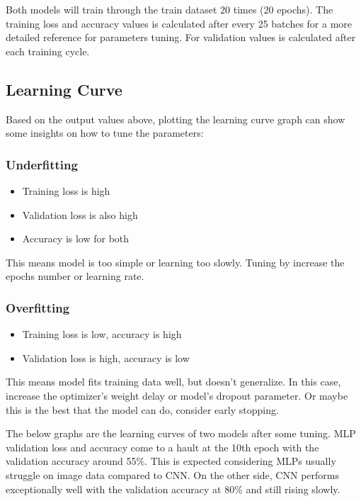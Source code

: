 \documentclass{report}
\begin{document}
Both models will train through the train dataset 20 times (20 epochs). The training loss and accuracy values is calculated 
after every 25 batches for a more detailed reference for parameters tuning. For validation values is calculated
after each training cycle.

\subsection{Learning Curve}
Based on the output values above, plotting the learning curve graph can show some insights on how to tune the 
parameters:

\subsubsection*{Underfitting}
\begin{itemize}
    \item Training loss is high
    \item Validation loss is also high
    \item Accuracy is low for both
\end{itemize}
This means model is too simple or learning too slowly. Tuning by increase the epochs number or learning rate.

\subsubsection*{Overfitting}
\begin{itemize}
    \item Training loss is low, accuracy is high
    \item Validation loss is high, accuracy is low
\end{itemize}
This means model fits training data well, but doesn't generalize. In this case, increase the optimizer's weight
delay or model's dropout parameter. Or maybe this is the best that the model can do, consider early stopping.

\newpage
The below graphs are the learning curves of two models after some tuning. MLP validation loss and accuracy
come to a hault at the 10th epoch with the validation accuracy around 55\%. This is expected considering MLPs 
usually struggle on image data compared to CNN. On the other side, CNN performs exceptionally well with the
validation accuracy at 80\% and still rising slowly. 
\end{document}
